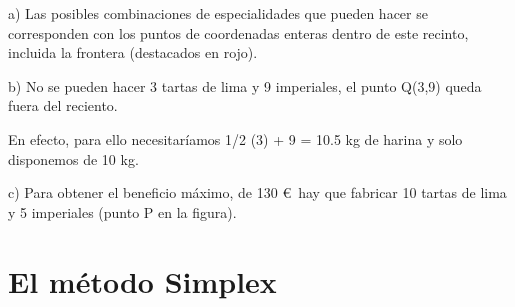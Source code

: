 \begin{destacado}
\begin{adjustwidth}{10pt}{10pt}
a) 	Las posibles combinaciones de especialidades que pueden hacer se corresponden con los puntos de coordenadas enteras dentro de este recinto, incluida la frontera (destacados en rojo).

b) No se pueden hacer 3 tartas de lima y 9 imperiales, el punto Q(3,9) queda fuera del reciento.

En efecto, para ello necesitaríamos 1/2 (3) + 9 = 10.5 kg de harina y solo disponemos de 10 kg.

c) Para obtener el beneficio máximo, de 130 \euro $\,$ hay que fabricar 10 tartas de lima y 5 imperiales (punto P en la figura).
\end{adjustwidth}
\end{destacado}
	

\section{El método Simplex}
	\vspace{5mm}	
			
